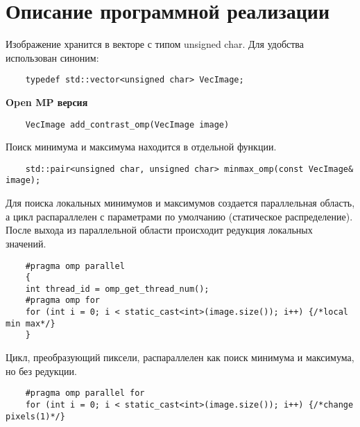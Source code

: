 \documentclass{report}
\begin{document}
    \newpage
    \section*{Описание программной реализации}
    \par Изображение хранится в векторе с типом unsigned char. Для удобства использован синоним:
    \begin{lstlisting}
    typedef std::vector<unsigned char> VecImage;
    \end{lstlisting}
    \textbf{Open MP версия}
    \begin{lstlisting}
    VecImage add_contrast_omp(VecImage image)
    \end{lstlisting}
    \par Поиск минимума и максимума находится в отдельной функции.
    \begin{lstlisting}
    std::pair<unsigned char, unsigned char> minmax_omp(const VecImage& image);
    \end{lstlisting}
    \par Для поиска локальных минимумов и максимумов создается параллельная область, а цикл распараллелен с параметрами по умолчанию (статическое распределение). После выхода из параллельной области происходит редукция локальных значений.
    \begin{lstlisting}
    #pragma omp parallel
    {
    int thread_id = omp_get_thread_num();
    #pragma omp for
    for (int i = 0; i < static_cast<int>(image.size()); i++) {/*local min max*/}
    }
    \end{lstlisting}
    \par Цикл, преобразующий пиксели, распараллелен как поиск минимума и максимума, но без редукции.
    \begin{lstlisting}
    #pragma omp parallel for
    for (int i = 0; i < static_cast<int>(image.size()); i++) {/*change pixels(1)*/}
    \end{lstlisting}
\end{document}

